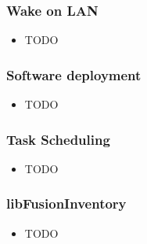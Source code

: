 \begin{frame}
    \frametitle{Wake on LAN}

    \begin{itemize}
        \item TODO
    \end{itemize}
\end{frame}

\begin{frame}
    \frametitle{Software deployment}

    \begin{itemize}
        \item TODO
    \end{itemize}
\end{frame}

\begin{frame}
    \frametitle{Task Scheduling}

    \begin{itemize}
        \item TODO
    \end{itemize}
\end{frame}

\begin{frame}
    \frametitle{libFusionInventory}
    
    \begin{itemize}
        \item TODO
    \end{itemize}
\end{frame}
